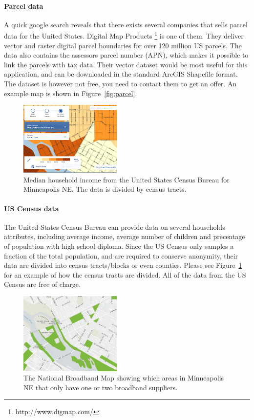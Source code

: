 \documentclass[twocolumn]{article}
\begin{document}
\paragraph{Parcel data}

\label{par:Parcel data}
A quick google search reveals that there exists several companies that sells parcel data for the United States. Digital Map Products \footnote{http://www.digmap.com/} is one of them. They deliver vector and raster digital parcel boundaries for over 120 million US parcels. The data also contains the assessors parcel number (APN), which makes it possible to link the parcels with tax data. Their vector dataset would be most useful for this application, and can be downloaded in the standard ArcGIS Shapefile format. The dataset is however not free, you need to contact them to get an offer. An example map is shown in Figure~\ref{fig:parcel}.

\begin{figure}
  \centering
  \includegraphics[width=0.45\textwidth]{img/census.png}
  \caption{Median household income from the United States Census Bureau for Minneapolis NE. The data is divided by census tracts.}
  \label{fig:census}
\end{figure}
\paragraph{US Census data}
\label{par:Us Census data}
The United States Census Bureau can provide data on several households attributes, including average income, average number of children and precentage of population with high school diploma. Since the US Census only samples a fraction of the total population, and are required to conserve anonymity, their data are divided into census tracts/blocks or even counties. Please see Figure~\ref{fig:census} for an example of how the census tracts are divided. All of the data from the US Census are free of charge.

\begin{figure}
  \centering
  \includegraphics[width=0.45\textwidth]{img/nbm.png}
  \caption{The National Broadband Map showing which areas in Minneapolis NE that only have one or two broadband suppliers.}
  \label{fig:nbm}
\end{figure}
\end{document}
